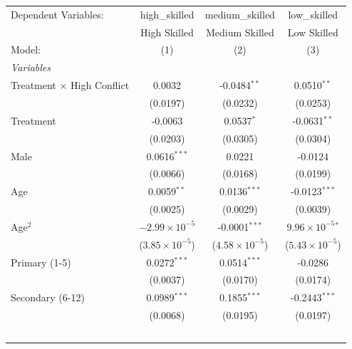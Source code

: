 
\begingroup
\centering
\begin{tabular}{lccc}
   \tabularnewline \midrule \midrule
   Dependent Variables:              & high\_skilled           & medium\_skilled         & low\_skilled\\   
                                     & High Skilled            & Medium Skilled          & Low Skilled \\   
   Model:                            & (1)                     & (2)                     & (3)\\  
   \midrule
   \emph{Variables}\\
   Treatment $\times$ High Conflict  & 0.0032                  & -0.0484$^{**}$          & 0.0510$^{**}$\\   
                                     & (0.0197)                & (0.0232)                & (0.0253)\\   
   Treatment                         & -0.0063                 & 0.0537$^{*}$            & -0.0631$^{**}$\\   
                                     & (0.0203)                & (0.0305)                & (0.0304)\\   
   Male                              & 0.0616$^{***}$          & 0.0221                  & -0.0124\\   
                                     & (0.0066)                & (0.0168)                & (0.0199)\\   
   Age                               & 0.0059$^{**}$           & 0.0136$^{***}$          & -0.0123$^{***}$\\   
                                     & (0.0025)                & (0.0029)                & (0.0039)\\   
   Age$^2$                           & $-2.99\times 10^{-5}$   & -0.0001$^{***}$         & $9.96\times 10^{-5}$$^{*}$\\    
                                     & ($3.85\times 10^{-5}$)  & ($4.58\times 10^{-5}$)  & ($5.43\times 10^{-5}$)\\    
   Primary (1-5)                     & 0.0272$^{***}$          & 0.0514$^{***}$          & -0.0286\\   
                                     & (0.0037)                & (0.0170)                & (0.0174)\\   
   Secondary (6-12)                  & 0.0989$^{***}$          & 0.1855$^{***}$          & -0.2443$^{***}$\\   
                                     & (0.0068)                & (0.0195)                & (0.0197)\\   
$$
\end{tabular}
